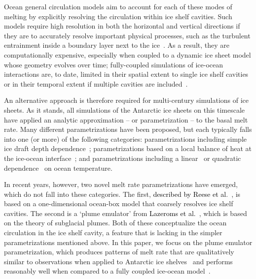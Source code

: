 \documentclass[openacc]{rsproca_new}%
\newcommand{\red}[1]{{\color{red} #1}}
\newcommand{\blue}[1]{{\color{blue} #1}}
\newcommand{\rout}[1]{\red{\st{#1}}}\newcommand{\ab}[1]{\textcolor{Green}{#1}}\newcommand{\about}[1]{\textcolor{Cyan}{\sout{#1}}}
\renewcommand{\rout}[1]{{}} %
\renewcommand{\blue}[1]{{\textcolor{black}{#1}}} %
\renewcommand{\red}[1]{{}} %
\begin{document}
Ocean general circulation models aim to account for each of these modes of melting by explicitly resolving the circulation within ice shelf cavities. Such models require high resolution in both the horizontal and vertical directions if they are to accurately resolve important physical processes, such as the turbulent entrainment inside a boundary layer next to the ice~\cite[e.g.][]{Kimura2014JPhysOcean}. As a result, they are computationally expensive, especially when coupled to a dynamic ice sheet model whose geometry evolves over time; fully-coupled simulations of ice-ocean interactions are, to date, limited in their spatial extent to single ice shelf cavities~\cite[e.g.][]{DeRydt2016JGeophysResEarthSurf, Seroussi2017GRL} or in their temporal extent if multiple cavities are included~\cite[e.g.][]{Naughten2018JClim}.

An alternative approach is therefore required for multi-century simulations of ice sheets. As it stands, all simulations of the Antarctic ice sheets on this timescale have applied an analytic approximation -- or parametrization -- to the basal melt rate. Many different parametrizations have been proposed, but each typically falls into one (or more) of the following categories: parametrizations including simple ice draft depth dependence~\cite[e.g.][]{Joughin2014Science}; parametrizations based on a local balance of heat at the ice-ocean interface~\cite[e.g][]{Golledge2015Nature}; and parametrizations including \rout{with }a linear~\cite[e.g.][]{Favier2016Cryo} or quadratic dependence~\cite[e.g.][]{Holland2008JClimate} on ocean temperature.

In recent years, however, two novel melt rate parametrizations have emerged, which do not fall into these categories. The first, \blue{ described by Reese et al}.~\cite{Reese2018Cryo}, is based on a one-dimensional ocean-box model that coarsely resolves ice shelf cavities. The second is a `plume emulator' from \blue{Lazeroms et al.}~\cite{Lazeroms2018TheCryo}, which is based on the theory of subglacial plumes. Both of these conceptualize the ocean circulation in the ice shelf cavity, a feature that is lacking in the simpler parametrizations mentioned above. In this paper, we focus on the plume emulator parametrization, which produces patterns of melt rate that are qualitatively similar to observations when applied to Antarctic ice shelves~\cite{Lazeroms2018TheCryo} and performs reasonably well when compared to a fully coupled ice-ocean model~\cite{Favier2019GeosciModDev}.
\end{document}
